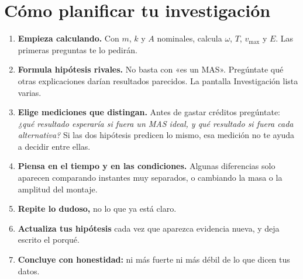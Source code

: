 \documentclass[11pt,a4paper]{article}
\begin{document}
\section{Cómo planificar tu investigación}

\begin{center}
\end{center}

\begin{enumerate}
\item \textbf{Empieza calculando.} Con $m$, $k$ y $A$ nominales, calcula $\omega$, $T$, $v_{\max}$ y $E$. Las primeras preguntas te lo pedirán.
\item \textbf{Formula hipótesis rivales.} No basta con «es un MAS». Pregúntate qué otras explicaciones darían resultados parecidos. La pantalla Investigación lista varias.
\item \textbf{Elige mediciones que distingan.} Antes de gastar créditos pregúntate: \emph{¿qué resultado esperaría si fuera un MAS ideal, y qué resultado si fuera cada alternativa?} Si las dos hipótesis predicen lo mismo, esa medición no te ayuda a decidir entre ellas.
\item \textbf{Piensa en el tiempo y en las condiciones.} Algunas diferencias solo aparecen comparando instantes muy separados, o cambiando la masa o la amplitud del montaje.
\item \textbf{Repite lo dudoso,} no lo que ya está claro.
\item \textbf{Actualiza tus hipótesis} cada vez que aparezca evidencia nueva, y deja escrito el porqué.
\item \textbf{Concluye con honestidad:} ni más fuerte ni más débil de lo que dicen tus datos.
\end{enumerate}
\end{document}
